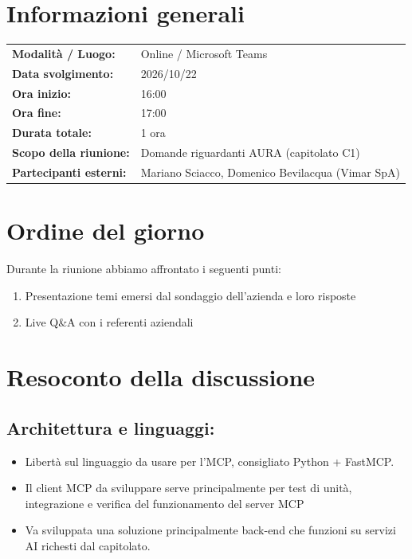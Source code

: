 \documentclass[a4paper, 11pt]{article}
\begin{document}
\newpage
\tableofcontents
\newpage


\section{Informazioni generali}
\begin{tabularx}{\textwidth}{l X}
    \textbf{Modalità / Luogo:} & Online / Microsoft Teams \\
    \textbf{Data svolgimento:} & 2026/10/22 \\
    \textbf{Ora inizio:} & 16:00 \\
    \textbf{Ora fine:} & 17:00 \\
    \textbf{Durata totale:} & 1 ora \\
    \textbf{Scopo della riunione:} & Domande riguardanti AURA (capitolato C1) \\
    \textbf{Partecipanti esterni:} & Mariano Sciacco, Domenico Bevilacqua (Vimar SpA)
\end{tabularx}

\newpage


\section{Ordine del giorno}
Durante la riunione abbiamo affrontato i seguenti punti:
\begin{enumerate}
    \item Presentazione temi emersi dal sondaggio dell'azienda e loro risposte
    \item Live Q&A con i referenti aziendali
\end{enumerate}

\newpage


\section{Resoconto della discussione}

\subsection{Architettura e linguaggi:}
\begin{itemize}
    \item Libertà sul linguaggio da usare per l'MCP, consigliato Python + FastMCP. \vspace{-0.1cm}
    \item Il client MCP da sviluppare serve principalmente per test di unità, integrazione e verifica del funzionamento del server MCP  \vspace{-0.1cm}
    \item Va sviluppata una soluzione principalmente back-end che funzioni su servizi AI richesti dal capitolato. \vspace{-0.1cm}
\end{itemize}
\end{document}
